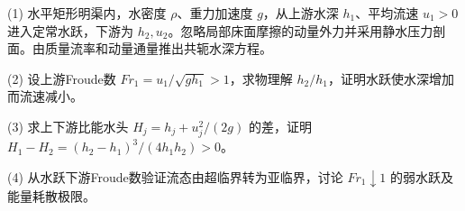 (1) 水平矩形明渠内，水密度 \(\rho\)、重力加速度 \(g\)，从上游水深 \(h_1\)、平均流速 \(u_1>0\) 进入定常水跃，下游为 \(h_2,u_2\)。忽略局部床面摩擦的动量外力并采用静水压力剖面。由质量流率和动量通量推出共轭水深方程。

(2) 设上游Froude数 \(Fr_1=u_1/\sqrt{gh_1}>1\)，求物理解 \(h_2/h_1\)，证明水跃使水深增加而流速减小。

(3) 求上下游比能水头 \(H_j=h_j+u_j^2/(2g)\) 的差，证明 \(H_1-H_2=(h_2-h_1)^3/(4h_1h_2)>0\)。

(4) 从水跃下游Froude数验证流态由超临界转为亚临界，讨论 \(Fr_1\downarrow1\) 的弱水跃及能量耗散极限。
